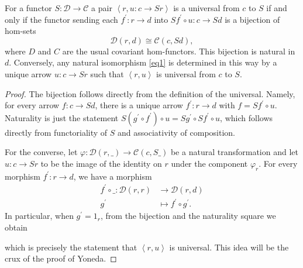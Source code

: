 \documentclass[10pt]{amsart}
\begin{document}
\begin{prop}
  For a functor $S \colon \mathcal{D} \rightarrow \mathcal{C}$ a pair $\left<r, u \colon c \rightarrow Sr\right>$ is a universal from $c$ to $S$ if and only if the functor sending each $f^\prime \colon r \rightarrow d$ into $Sf^\prime \circ u \colon c \rightarrow Sd$ is a bijection of hom-sets
  \begin{equation}\label{eq1}
    \mathcal{D}(r,d) \cong \mathcal{C}(c,Sd),
  \end{equation}
  where $D$ and $C$ are the usual covariant hom-functors.
  This bijection is natural in $d$.
  Conversely, any natural isomorphism \eqref{eq1} is determined in this way by a unique arrow $u \colon c \rightarrow Sr$ such that $\left<r,u\right>$ is universal from $c$ to $S$.
  
  \begin{proof}
    The bijection follows directly from the definition of the universal.
    Namely, for every arrow $f \colon c \rightarrow Sd$, there is a unique arrow $f^\prime \colon r \rightarrow d$ with $f = Sf^\prime \circ u$.
    Naturality is just the statement $S(g^\prime \circ f^\prime) \circ u = Sg^\prime \circ Sf^\prime \circ u$, which follows directly from functoriality of $S$ and associativity of composition.

    For the converse, let $\varphi \colon \mathcal{D}(r,\_) \rightarrow \mathcal{C}(c, {S\_})$ be a natural transformation and let $u \colon c \rightarrow Sr$ to be the image of the identity on $r$ under the component $\varphi_r$.
    For every morphism $f^\prime \colon r \rightarrow d$, we have a morphism
    \begin{align*}
      f^\prime \circ \_ \colon \mathcal{D}(r,r) &\rightarrow \mathcal{D}(r,d)\\
      g^\prime &\mapsto f^\prime \circ g^\prime.
    \end{align*}
    In particular, when $g^\prime = 1_r$, from the bijection and the naturality square we obtain
    \begin{center}
    \end{center}
    which is precisely the statement that $\left<r, u\right>$ is universal.
    This idea will be the crux of the proof of Yoneda.
  \end{proof}
\end{prop}
\end{document}
